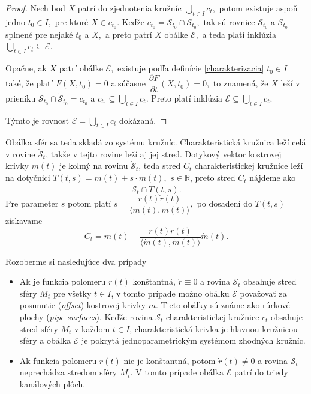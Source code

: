 \begin{proof}
Nech bod $X$ patrí do zjednotenia kružníc $ \bigcup_{t \in I} c_{t}, $ potom existuje aspoň jedno $t_0 \in I, $ pre ktoré $X \in c_{t_0}.$ Keďže $c_{t_0} = \mathcal{S}_{t_0} \cap \mathcal{\dot{S}}_{t_0}, $ tak sú rovnice $\mathcal{S}_{t_0} $ a $ \mathcal{\dot{S}}_{t_0}$ splnené pre nejaké $t_0$ a $X,$ a preto patrí $X$ obálke $\mathcal{E}, $ a teda platí inklúzia $\bigcup_{t \in I} c_{t} \subseteq \mathcal{E}. $

Opačne, ak $X$ patrí obálke $\mathcal{E},$ existuje podľa definície \ref{charakterizacia} $t_0 \in I $ také, že platí $F(X,t_0) = 0$ a súčasne $\dfrac{\partial F}{\partial t}(X, t_0)=0,$ to znamená, že $X$ leží v prieniku $\mathcal{S}_{t_0} \cap \mathcal{\dot{S}}_{t_0} = c_{t_0} $ a $c_{t_0} \subseteq \bigcup_{t \in I} c_t. $ Preto platí inklúzia $\mathcal{E} \subseteq \bigcup_{t \in I} c_t.$ 

Týmto je rovnosť $\mathcal{E} = \bigcup_{t \in I} c_t$ dokázaná.
\end{proof}

Obálka sfér sa teda skladá zo systému kružníc. Charakteristická kružnica leží celá v rovine $\mathcal{\dot{S}}_t $, takže v tejto rovine leží aj jej stred. Dotykový vektor kostrovej krivky $m(t)$ je kolmý na rovinu $\mathcal{\dot{S}}_t$, teda stred $C_t$ charakteristickej kružnice leží na dotyčnici $T(t, s)= m(t) + s \cdot \dot{m}(t),$ $s \in \mathbb{R}$, preto stred $C_t$ nájdeme ako
$$ \mathcal{\dot{S}}_t \cap T(t, s).$$
Pre parameter $s$ potom platí $s = \dfrac{r(t) \dot{r}(t)}{\langle \dot{m}(t), \dot{m}(t) \rangle }, $
po dosadení do $T(t, s)$ získavame
\begin{equation}
\label{eq:stred charakteristickej kruznice}
C_t = m(t) - \frac{r(t) \dot{r}(t)}{\langle \dot{m}(t), \dot{m}(t) \rangle} \dot{m}(t).
\end{equation}

Rozoberme si nasledujúce dva prípady
\begin{itemize}
\item Ak je funkcia polomeru $r(t)$ konštantná, $\dot{r} \equiv 0$ a rovina $\mathcal{\dot{S}}_t$ obsahuje stred sféry $M_t$ pre všetky $t \in I$, v tomto prípade možno obálku $\mathcal{E}$ považovať za posunutie (\textit{offset}) kostrovej krivky $m$. Tieto obálky sú známe ako rúrkové plochy (\textit{pipe surfaces}). Keďže rovina $\mathcal{\dot{S}}_t$ charakteristickej kružnice $c_t$ obsahuje stred sféry $M_t$ v každom $t \in I$, charakteristická krivka je hlavnou kružnicou sféry a obálka $\mathcal{E}$ je pokrytá jednoparametrickým systémom zhodných kružníc.
\item Ak funkcia polomeru $r(t)$ nie je konštantná, potom $\dot{r}(t) \neq 0$ a rovina $\mathcal{\dot{S}}_t$  neprechádza stredom sféry $M_t$. V tomto prípade obálka $\mathcal{E}$ patrí do triedy kanálových plôch.
\end{itemize}

